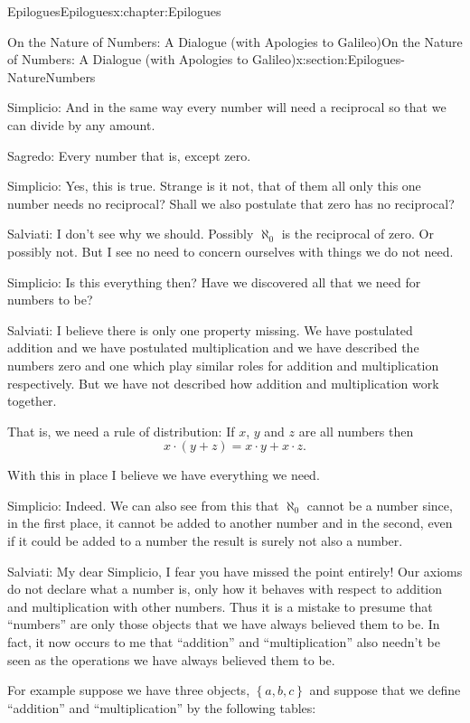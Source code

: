 \begin{chapterptx}{Epilogues}{}{Epilogues}{}{}{x:chapter:Epilogues}
\begin{sectionptx}{On the Nature of Numbers: A Dialogue (with Apologies to Galileo)}{}{On the Nature of Numbers: A Dialogue (with Apologies to Galileo)}{}{}{x:section:Epilogues-NatureNumbers}
\begin{introduction}{}
			\par
			\alert{Simplicio}:  And in the same way every number will need a reciprocal so that we can divide by any amount.%
			\par
			\alert{Sagredo}:  Every number that is, except zero.%
			\par
			\alert{Simplicio}:  Yes, this is true. Strange is it not, that of them all only this one number needs no reciprocal? Shall we also postulate that zero has no reciprocal?%
			\par
			\alert{Salviati}: I don't see why we should. Possibly \(\aleph_0\) is the reciprocal of zero. Or possibly not. But I see no need to concern ourselves with things we do not need.%
			\par
			\alert{Simplicio}: Is this everything then? Have we discovered all that we need for numbers to be?%
			\par
			\alert{Salviati}: I believe there is only one property missing. We have postulated addition and we have postulated multiplication and we have described the numbers zero and one which play similar roles for addition and multiplication respectively. But we have not described how addition and multiplication work together.%
			\par
			That is, we need a rule of distribution:  If \(x\), \(y\) and \(z\) are all numbers then%
			\begin{equation*}
				x\cdot(y+z) = x\cdot y+x\cdot z\text{.}
			\end{equation*}
			\par
			With this in place I believe we have everything we need.%
			\par
			\alert{Simplicio}:  Indeed. We can also see from this that \(\aleph_0\) cannot be a number since, in the first place, it cannot be added to another number and in the second, even if it could be added to a number the result is surely not also a number.%
			\par
			\alert{Salviati}:  My dear Simplicio, I fear you have missed the point entirely! Our axioms do not declare what a number is, only how it behaves with respect to addition and multiplication with other numbers. Thus it is a mistake to presume that ``numbers'' are only those objects that we have always believed them to be. In fact, it now occurs to me that ``addition'' and ``multiplication'' also needn't be seen as the operations we have always believed them to be.%
			\par
			For example suppose we have three objects, \(\left\{a, b, c\right\}\) and suppose that we define ``addition'' and ``multiplication'' by the following tables:%

\end{introduction}
\end{sectionptx}
\end{chapterptx}
